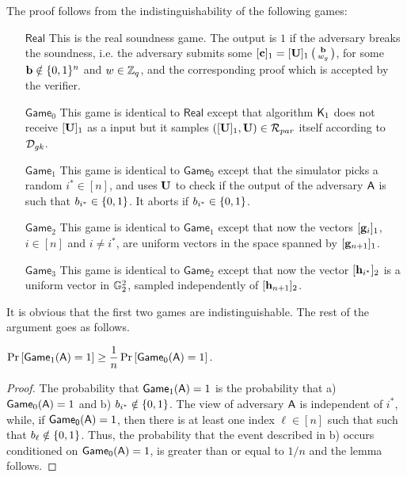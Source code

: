 The proof follows from the indistinguishability of the following games:
\begin{itemize}
\item [$\mathsf{Real}$] This is the real soundness game. 
 The output is $1$ if  the adversary breaks the soundness,
i.e. the adversary submits
some $[\mathbf{c}]_1 = [\mathbf{{U}}]_1\left(\begin{smallmatrix}\mathbf{b}\\ w_g\end{smallmatrix}\right)$, for some
$\mathbf{b}\notin \{0,1\}^n$ and $w \in \mathbb{Z}_q$, and
the corresponding proof which is accepted by the verifier.
\item[$\mathsf{Game}_0$] This game is identical to 
$\mathsf{Real}$ except that algorithm $\mathsf{K}_1$ does not receive $[\mathbf{{U}}]_1$ as a input but it samples
$([\mathbf{{U}}]_1,\mathbf{{U}}) \in \mathcal{R}_{par}$
itself according to $\mathcal{D}_{{gk}}$.
\item[$\mathsf{Game}_1$] This game is identical to 
$\mathsf{Game_0}$ except that the simulator picks a random $i^* \in [n]$, and uses $\mathbf{{U}}$ to check  
    if the output of the adversary $\mathsf{A}$ is such that 
    $b_{i^*}\in \{0,1\}$.  It aborts if  $b_{i^*}\in \{0,1\}$.
\item[$\mathsf{Game}_{2}$] This game is identical to 
$\mathsf{Game}_1$ except that now the vectors $[\mathbf{g}_{i}]_1$, $i \in [n]$ and $i \neq i^*$,
are uniform vectors in the space spanned by $[\mathbf{g}_{n+1}]_1$.   
\item[$\mathsf{Game}_{3}$] This game is identical to 
$\mathsf{Game}_2$ except that now the vector $[\mathbf{h}_{i^*}]_2$ is 
a uniform vector in $\mathbb{G}_2^2$, sampled independently of 
$[\mathbf{h}_{n+1}]_2$.     
\end{itemize}
It is obvious that the first two games are indistinguishable. 
The rest of the argument goes as follows. 

\begin{lemma} $\Pr\left[ \mathsf{Game}_1(\mathsf{A})=1\right]\geq\dfrac{1}{n}\Pr\left[\mathsf{Game}_0(\mathsf{A})=1\right].$
\label{lemma:bits1}
\end{lemma}

\begin{proof}  The probability that
 $\mathsf{Game}_1(\mathsf{A})=1$ is the probability that  a) $\mathsf{Game}_0(\mathsf{A})=1$ and
b)  $b_{i^*} \notin \{0,1\}$. The view of adversary $\mathsf{A}$ is independent of $i^*$, while, if $\mathsf{Game_0}(\mathsf{A})=1$, then there is at least one index $\ell \in [n]$ such that  
such that  $b_{\ell} \notin \{0,1\}$. Thus, 
the probability that the event described in b) occurs conditioned on $\mathsf{Game_0}(\mathsf{A})=1$, is greater than or equal to $1/n$ and the lemma follows.
\end{proof}

